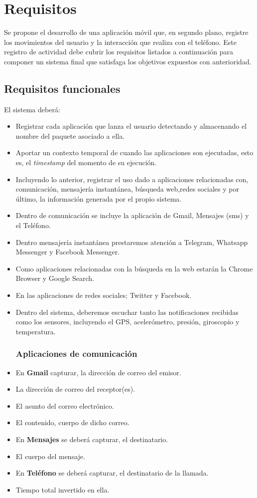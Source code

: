 \documentclass[12pt,a4paper,oneside]{book} %
\begin{document}
\section{Requisitos}
Se propone el desarrollo de una aplicación móvil que, en segundo plano, registre los movimientos del usuario y la interacción que realiza con el teléfono. Este registro de actividad debe cubrir los requisitos listados a continuación para componer un sistema final que satisfaga los objetivos expuestos con anterioridad. 
\subsection{Requisitos funcionales}
El sistema deberá: 
\begin{itemize}
  \item Registrar cada aplicación que lanza el usuario detectando y almacenando el nombre del paquete asociado a ella. 
  \item Aportar un contexto temporal de cuando las aplicaciones son ejecutadas, esto es, el \textit{timestamp} del momento de su ejecución. 
  \item Incluyendo lo anterior, registrar el uso dado a aplicaciones relacionadas con, comunicación, mensajería instantánea, búsqueda web,redes sociales y por último, la información generada por el propio sistema. 
  \item Dentro de comunicación se incluye la aplicación de Gmail, Mensajes (sms) y el Teléfono. 
  \item Dentro mensajería instantánea prestaremos atención a Telegram, Whatsapp Messenger y Facebook Messenger. 
  \item Como aplicaciones relacionadas con la búsqueda en la web estarán la Chrome Browser y Google Search. 
  \item En las aplicaciones de redes sociales; Twitter y Facebook.
  \item Dentro del sistema, deberemos escuchar tanto las notificaciones recibidas como los sensores, incluyendo el GPS, acelerómetro, presión, giroscopio y temperatura.
\subsubsection{Aplicaciones de comunicación}
  \item En  \textbf{Gmail} capturar, la dirección de correo del emisor. 
  \item La dirección de correo del receptor(es). 
  \item El asunto del correo electrónico. 
  \item El contenido, cuerpo de dicho correo. 
  \item En \textbf{Mensajes} se deberá capturar, el destinatario. 
  \item El cuerpo del mensaje. 
  \item En \textbf{Teléfono} se deberá capturar, el destinatario de la llamada. 
  \item Tiempo total invertido en ella. 

\end{itemize}
\end{document}
